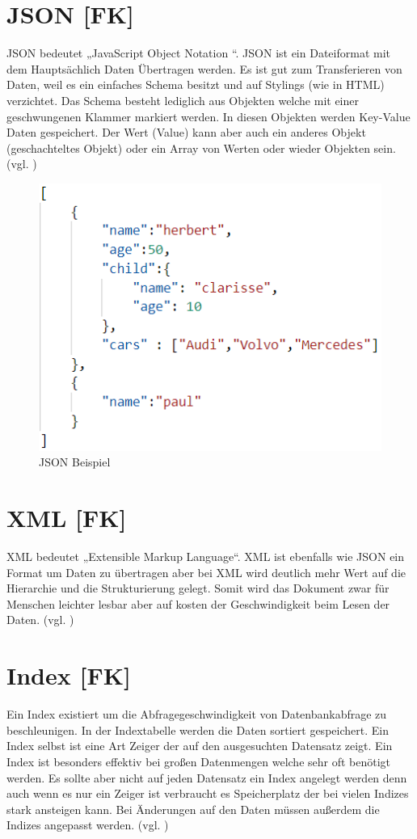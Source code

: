 \section{JSON [FK]}\label{sec:json}
JSON bedeutet „JavaScript Object Notation “. JSON ist ein Dateiformat mit dem Hauptsächlich Daten Übertragen werden. Es ist gut zum Transferieren von Daten, weil es ein einfaches Schema besitzt und auf Stylings (wie in HTML) verzichtet. Das Schema besteht lediglich aus Objekten welche mit einer geschwungenen Klammer markiert werden. In diesen Objekten werden Key-Value Daten gespeichert. Der Wert (Value) kann aber auch ein anderes Objekt (geschachteltes Objekt) oder ein Array von Werten oder wieder Objekten sein. (vgl. \cite{JsonVsXml})
\begin{figure}[H]
    \includegraphics[scale=1]{images/jsonExample.PNG}
    \caption{JSON Beispiel}
    \label{img:jsonExample}
\end{figure}
\section{XML [FK]}\label{sec:xml}
XML bedeutet „Extensible Markup Language“. XML ist ebenfalls wie JSON ein Format um Daten zu übertragen aber bei XML wird deutlich mehr Wert auf die Hierarchie und die Strukturierung gelegt. Somit wird das Dokument zwar für Menschen leichter lesbar aber auf kosten der Geschwindigkeit beim Lesen der Daten. (vgl. \cite{JsonVsXml})
\section{Index [FK]}\label{sec:Index}
Ein Index existiert um die Abfragegeschwindigkeit von Datenbankabfrage zu beschleunigen. In der Indextabelle werden die Daten sortiert gespeichert. Ein Index selbst ist eine Art Zeiger der auf den ausgesuchten Datensatz zeigt. Ein Index ist besonders effektiv bei großen Datenmengen welche sehr oft benötigt werden. Es sollte aber nicht auf jeden Datensatz ein Index angelegt werden denn auch wenn es nur ein Zeiger ist verbraucht es Speicherplatz der bei vielen Indizes stark ansteigen kann. Bei Änderungen auf den Daten müssen außerdem die Indizes angepasst werden. (vgl. \cite{Index})
